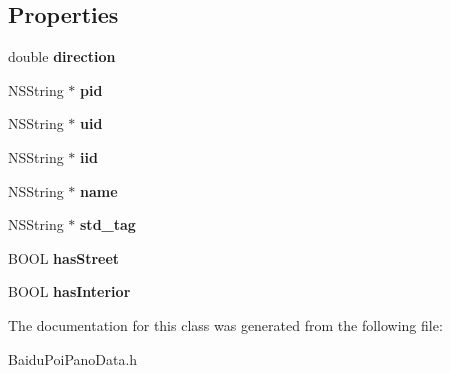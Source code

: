 \subsection*{Properties}
\begin{DoxyCompactItemize}
\item 
\hypertarget{interface_baidu_poi_pano_data_a17c4b24a13ac5206d0748fe7048786ff}{}double {\bfseries direction}\label{interface_baidu_poi_pano_data_a17c4b24a13ac5206d0748fe7048786ff}

\item 
\hypertarget{interface_baidu_poi_pano_data_a4384437b74823a591e6ca9226ea38219}{}N\+S\+String $\ast$ {\bfseries pid}\label{interface_baidu_poi_pano_data_a4384437b74823a591e6ca9226ea38219}

\item 
\hypertarget{interface_baidu_poi_pano_data_a7b0c8edd5a8f85c9b9e31acf4e235a43}{}N\+S\+String $\ast$ {\bfseries uid}\label{interface_baidu_poi_pano_data_a7b0c8edd5a8f85c9b9e31acf4e235a43}

\item 
\hypertarget{interface_baidu_poi_pano_data_a125180d9df669dc673181c88fa021d0b}{}N\+S\+String $\ast$ {\bfseries iid}\label{interface_baidu_poi_pano_data_a125180d9df669dc673181c88fa021d0b}

\item 
\hypertarget{interface_baidu_poi_pano_data_aeb7c0130c5f013a37ff09a3f819713aa}{}N\+S\+String $\ast$ {\bfseries name}\label{interface_baidu_poi_pano_data_aeb7c0130c5f013a37ff09a3f819713aa}

\item 
\hypertarget{interface_baidu_poi_pano_data_a072afe529557cdede7eeaa41a61d082f}{}N\+S\+String $\ast$ {\bfseries std\+\_\+tag}\label{interface_baidu_poi_pano_data_a072afe529557cdede7eeaa41a61d082f}

\item 
\hypertarget{interface_baidu_poi_pano_data_a6b48d7057a5a8b779edb488712d9c1c8}{}B\+O\+O\+L {\bfseries has\+Street}\label{interface_baidu_poi_pano_data_a6b48d7057a5a8b779edb488712d9c1c8}

\item 
\hypertarget{interface_baidu_poi_pano_data_a36eaadc35ae42faf0e6fab9713b1fef5}{}B\+O\+O\+L {\bfseries has\+Interior}\label{interface_baidu_poi_pano_data_a36eaadc35ae42faf0e6fab9713b1fef5}

\end{DoxyCompactItemize}


The documentation for this class was generated from the following file\+:\begin{DoxyCompactItemize}
\item 
Baidu\+Poi\+Pano\+Data.\+h\end{DoxyCompactItemize}
